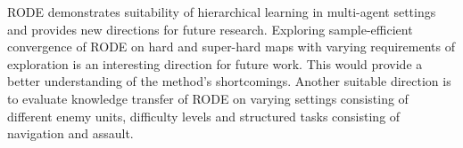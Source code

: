 \documentclass[11pt,letterpaper]{article}
\begin{document}
RODE demonstrates suitability of hierarchical learning in multi-agent settings and provides new directions for future research. Exploring sample-efficient convergence of RODE on hard and super-hard maps with varying requirements of exploration is an interesting direction for future work. This would provide a better understanding of the method's shortcomings. Another suitable direction is to evaluate knowledge transfer of RODE on varying settings consisting of different enemy units, difficulty levels and structured tasks consisting of navigation and assault. 
\end{document}
